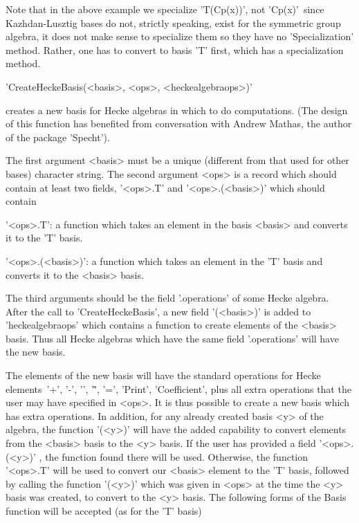 Note  that in  the above  example we  specialize 'T(Cp(x))', not 'Cp(x)'\:\
since  Kazhdan-Lusztig  bases  do  not,  strictly  speaking,  exist for the
symmetric  group algebra, it does not make sense to specialize them so they
have  no 'Specialization' method.  Rather, one has  to convert to basis 'T'
first, which has a specialization method.

\Section{CreateHeckeBasis}

'CreateHeckeBasis(<basis>, <ops>, <heckealgebraops>)'

creates a new basis for Hecke algebras in  which to do computations. (The
design of this   function has  benefited  from conversation  with  Andrew
Mathas, the author of the package 'Specht').

The first argument <basis> must be a unique (different from that used for
other bases)  character string.  The   second argument <ops> is  a record
which should contain at least two fields, '<ops>.T' and '<ops>.(<basis>)'
which should contain \:

 '<ops>.T': a  function which takes  an element in  the basis <basis> and
  converts it to the 'T' basis.

 '<ops>.(<basis>)': a function  which takes an element  in the  'T' basis
  and converts it to the <basis> basis.

The  third arguments  should be  the field  '.operations' of  some Hecke
algebra. After the  call to 'CreateHeckeBasis', a  new field '(<basis>)'
is  added  to 'heckealgebraops'  which  contains  a function  to  create
elements of  the <basis> basis. Thus  all Hecke algebras which  have the
same field '.operations' will have the new basis.

The elements  of the  new basis  will have  the standard  operations for
Hecke  elements\:\ '+',  '-', '\*',  '\^', '=',  'Print', 'Coefficient',
plus all extra operations that the  user may have specified in <ops>. It
is thus  possible to create a  new basis which has  extra operations. In
addition, for any already created basis <y> of the algebra, the function
'(<y>)'  will have  the added  capability to  convert elements  from the
<basis>  basis to  the  <y> basis.  If  the user  has  provided a  field
'<ops>.(<y>)' ,  the function found  there will be used.  Otherwise, the
function '<ops>.T'  will be used to  convert our <basis> element  to the
'T' basis, followed  by calling the function '(<y>)' which  was given in
<ops> at  the time  the <y>  basis was  created, to  convert to  the <y>
basis. The  following forms of the  Basis function will be  accepted (as
for the 'T' basis)\:

